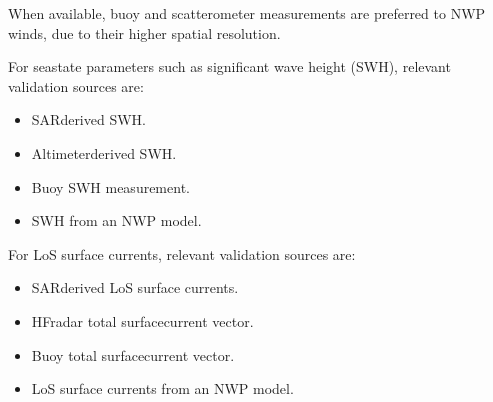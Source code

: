 \documentclass[a4paper,10pt,english]{sphinxmanual}
\begin{document}
\sphinxAtStartPar
When available, buoy and scatterometer measurements are preferred to NWP
winds, due to their higher spatial resolution.

\sphinxAtStartPar
For sea\sphinxhyphen{}state parameters such as significant wave height (SWH), relevant
validation sources are:
\begin{itemize}
\item {} 
\sphinxAtStartPar
SAR\sphinxhyphen{}derived SWH.

\item {} 
\sphinxAtStartPar
Altimeter\sphinxhyphen{}derived SWH.

\item {} 
\sphinxAtStartPar
Buoy SWH measurement.

\item {} 
\sphinxAtStartPar
SWH from an NWP model.

\end{itemize}

\sphinxAtStartPar
For LoS surface currents, relevant validation sources are:
\begin{itemize}
\item {} 
\sphinxAtStartPar
SAR\sphinxhyphen{}derived LoS surface currents.

\item {} 
\sphinxAtStartPar
HF\sphinxhyphen{}radar total surface\sphinxhyphen{}current vector.

\item {} 
\sphinxAtStartPar
Buoy total surface\sphinxhyphen{}current vector.

\item {} 
\sphinxAtStartPar
LoS surface currents from an NWP model.

\end{itemize}

\sphinxAtStartPar
{}
\end{document}
